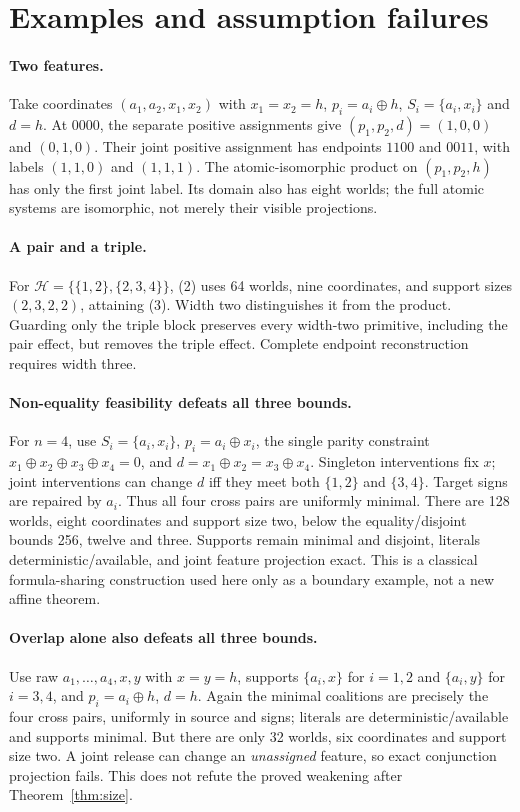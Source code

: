 \documentclass[11pt]{article}
\newcommand{\Hh}{\mathcal H}
\newcommand{\xor}{\mathbin\oplus}
\begin{document}
\section{Examples and assumption failures}
\paragraph{Two features.}
Take coordinates $(a_1,a_2,x_1,x_2)$ with $x_1=x_2=h$, $p_i=a_i\xor h$, $S_i=\{a_i,x_i\}$ and $d=h$. At $0000$, the separate positive assignments give $(p_1,p_2,d)=(1,0,0)$ and $(0,1,0)$. Their joint positive assignment has endpoints $1100$ and $0011$, with labels $(1,1,0)$ and $(1,1,1)$. The atomic-isomorphic product on $(p_1,p_2,h)$ has only the first joint label. Its domain also has eight worlds; the full atomic systems are isomorphic, not merely their visible projections.

\paragraph{A pair and a triple.}
For $\Hh=\{\{1,2\},\{2,3,4\}\}$, (2) uses 64 worlds, nine coordinates, and support sizes $(2,3,2,2)$, attaining (3). Width two distinguishes it from the product. Guarding only the triple block preserves every width-two primitive, including the pair effect, but removes the triple effect. Complete endpoint reconstruction requires width three.

\paragraph{Non-equality feasibility defeats all three bounds.}
For $n=4$, use $S_i=\{a_i,x_i\}$, $p_i=a_i\xor x_i$, the single parity constraint $x_1\xor x_2\xor x_3\xor x_4=0$, and $d=x_1\xor x_2=x_3\xor x_4$. Singleton interventions fix $x$; joint interventions can change $d$ iff they meet both $\{1,2\}$ and $\{3,4\}$. Target signs are repaired by $a_i$. Thus all four cross pairs are uniformly minimal. There are 128 worlds, eight coordinates and support size two, below the equality/disjoint bounds 256, twelve and three. Supports remain minimal and disjoint, literals deterministic/available, and joint feature projection exact. This is a classical formula-sharing construction used here only as a boundary example, not a new affine theorem.

\paragraph{Overlap alone also defeats all three bounds.}
Use raw $a_1,\ldots,a_4,x,y$ with $x=y=h$, supports $\{a_i,x\}$ for $i=1,2$ and $\{a_i,y\}$ for $i=3,4$, and $p_i=a_i\xor h$, $d=h$. Again the minimal coalitions are precisely the four cross pairs, uniformly in source and signs; literals are deterministic/available and supports minimal. But there are only 32 worlds, six coordinates and support size two. A joint release can change an \emph{unassigned} feature, so exact conjunction projection fails. This does not refute the proved weakening after Theorem~\ref{thm:size}.
\end{document}
